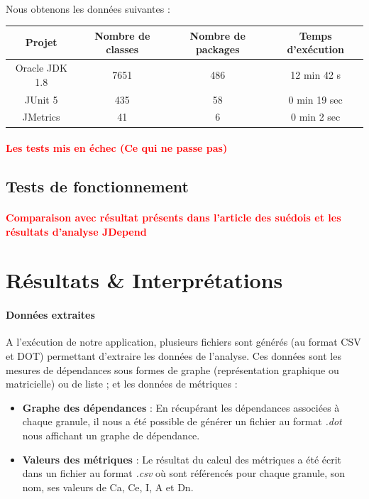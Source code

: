 \documentclass{scrartcl}
\newcommand{\TODO}[1] {
    \noindent \paragraph{\textcolor{red}{#1}}
}
\begin{document}
    \paragraph{}Nous obtenons les données suivantes : 
    \begin{center}
        \begin{tabular}{|c|c|c|c|}\hline
            Projet & Nombre de classes & Nombre de packages & Temps d'exécution \\ \hline
            Oracle JDK 1.8 & 7651 & 486 & 12 min 42 s \\ \hline
            JUnit 5 & 435 & 58 & 0 min 19 sec \\ \hline
            JMetrics & 41 & 6 & 0 min 2 sec \\ \hline
        \end{tabular}
    \end{center}

    \TODO{Les tests mis en échec (Ce qui ne passe pas)}


\subsection{Tests de fonctionnement}
    \TODO{Comparaison avec résultat présents dans l'article des suédois et les résultats d'analyse JDepend}

\newpage
\section{Résultats \& Interprétations}

    \paragraph{Données extraites}A l'exécution de notre application, plusieurs fichiers sont générés (au format CSV et DOT) permettant d'extraire les données de l'analyse. Ces données sont les mesures de dépendances sous formes de graphe (représentation graphique ou matricielle) ou de liste ; et les données de métriques :
    \begin{itemize}
        \item \textbf{Graphe des dépendances} : En récupérant les dépendances associées à chaque granule, il nous a été possible de générer un fichier au format \emph{.dot} nous affichant un graphe de dépendance. 
        \item \textbf{Valeurs des métriques} : Le résultat du calcul des métriques a été écrit dans un fichier au format \emph{.csv} où sont référencés pour chaque granule, son nom, ses valeurs de Ca, Ce, I, A et Dn.
    \end{itemize}
\end{document}
